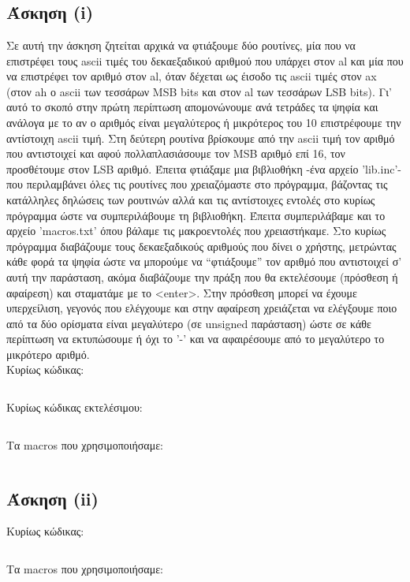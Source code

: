 \documentclass[a4paper,10pt]{article} \usepackage{anysize}
\begin{document}


\section*{} 
\subsection*{Άσκηση (i)}
Σε αυτή την άσκηση ζητείται αρχικά να φτιάξουμε δύο ρουτίνες, μία που να
επιστρέφει τους ascii τιμές του δεκαεξαδικού αριθμού που υπάρχει στον al και
μία που να επιστρέφει τον αριθμό στον al, όταν δέχεται ως έισοδο τις ascii
τιμές στον ax (στον ah ο ascii των τεσσάρων MSB bits και στον al των τεσσάρων
LSB bits). Γι' αυτό το σκοπό στην πρώτη περίπτωση απομονώνουμε ανά τετράδες τα
ψηφία και ανάλογα με το αν ο αριθμός είναι μεγαλύτερος ή μικρότερος του 10
επιστρέφουμε την αντίστοιχη ascii τιμή. Στη δεύτερη ρουτίνα βρίσκουμε από την
ascii τιμή τον αριθμό που αντιστοιχεί και αφού πολλαπλασιάσουμε τον MSB αριθμό
επί 16, τον προσθέτουμε στον LSB αριθμό. Έπειτα φτιάξαμε μια βιβλιοθήκη -ένα
αρχείο 'lib.inc'- που περιλαμβάνει όλες τις ρουτίνες που χρειαζόμαστε στο
πρόγραμμα, βάζοντας τις κατάλληλες δηλώσεις των ρουτινών αλλά και τις
αντίστοιχες εντολές στο κυρίως πρόγραμμα ώστε να συμπεριλάβουμε τη βιβλιοθήκη.
Έπειτα συμπεριλάβαμε και το αρχείο 'macros.txt' όπου βάλαμε τις μακροεντολές
που χρειαστήκαμε.  Στο κυρίως πρόγραμμα διαβάζουμε τους δεκαεξαδικούς αριθμούς
που δίνει ο χρήστης, μετρώντας κάθε φορά τα ψηφία ώστε να μπορούμε να
“φτιάξουμε” τον αριθμό που αντιστοιχεί σ' αυτή την παράσταση, ακόμα διαβάζουμε
την πράξη που θα εκτελέσουμε (πρόσθεση ή αφαίρεση) και σταματάμε με το
<enter>. Στην πρόσθεση μπορεί να έχουμε υπερχείλιση, γεγονός που ελέγχουμε και
στην αφαίρεση χρειάζεται να ελέγξουμε ποιο από τα δύο ορίσματα είναι
μεγαλύτερο (σε unsigned παράσταση) ώστε σε κάθε περίπτωση να εκτυπώσουμε ή όχι
το '-' και να αφαιρέσουμε από το μεγαλύτερο το μικρότερο αριθμό.\\[0.5cm]

\noindent Κυρίως κώδικας:
\inputminted[linenos,obeytabs,fontsize=\footnotesize]{nasm}{files/lib.inc}
\noindent Κυρίως κώδικας εκτελέσιμου:
\inputminted[linenos,obeytabs,fontsize=\footnotesize]{nasm}{files/1.asm}
\noindent Τα macros που χρησιμοποιήσαμε:
\inputminted[linenos,obeytabs,fontsize=\footnotesize]{nasm}{files/1.txt}
\subsection*{Άσκηση (ii)}

\noindent Κυρίως κώδικας:
\inputminted[linenos,obeytabs,fontsize=\footnotesize]{nasm}{files/2.asm}
Τα macros που χρησιμοποιήσαμε:
\inputminted[linenos,obeytabs,fontsize=\footnotesize]{nasm}{files/2.txt}
\end{document}
